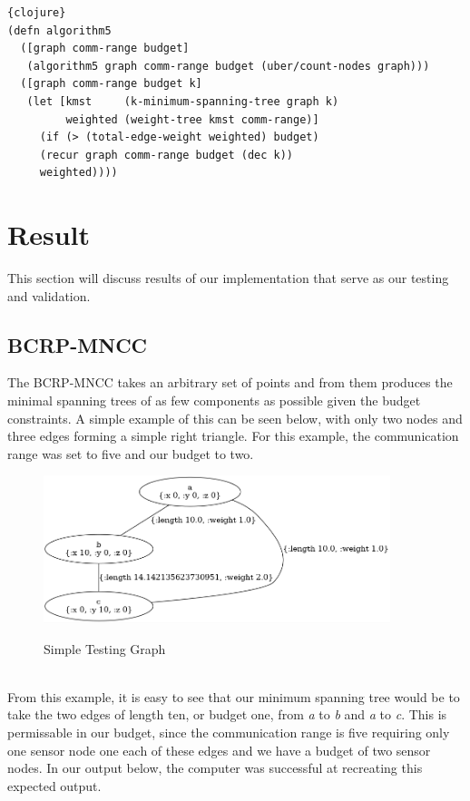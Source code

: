 \documentclass{article}
\begin{document}
\begin{lstlisting}{clojure}
(defn algorithm5
  ([graph comm-range budget]
   (algorithm5 graph comm-range budget (uber/count-nodes graph)))
  ([graph comm-range budget k]
   (let [kmst     (k-minimum-spanning-tree graph k)
         weighted (weight-tree kmst comm-range)]
     (if (> (total-edge-weight weighted) budget)
     (recur graph comm-range budget (dec k))
     weighted))))
\end{lstlisting}

\section{Result}
This section will discuss results of our implementation that serve as our testing and validation.

\subsection{BCRP-MNCC}
The BCRP-MNCC takes an arbitrary set of points and from them produces the minimal spanning trees of as few components as possible given the budget constraints.
A simple example of this can be seen below, with only two nodes and three edges forming a simple right triangle.
For this example, the communication range was set to five and our budget to two.
\begin{figure}[h]
\centering
\includegraphics[width=0.9\textwidth]{examples/loc0_graph.png}
\label{loc0_graph}
\caption{Simple Testing Graph}
\end{figure}\\
From this example, it is easy to see that our minimum spanning tree would be to take the two edges of length ten, or budget one, from \textit{a} to \textit{b} and \textit{a} to \textit{c}.
This is permissable in our budget, since the communication range is five requiring only one sensor node one each of these edges and we have a budget of two sensor nodes.
In our output below, the computer was successful at recreating this expected output.
\end{document}
